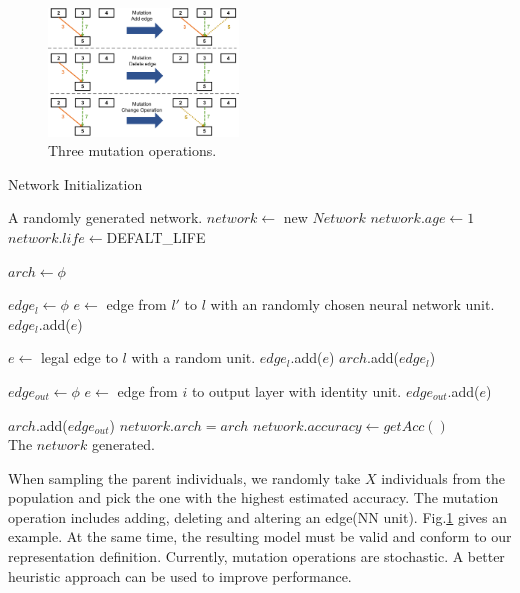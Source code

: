 \documentclass{article}
\begin{document}
\begin{normalsize}
 \begin{figure}[H]
   \centering
   \includegraphics[width=0.45\textwidth]{figures/mutation.png}
   \caption{Three mutation operations.}\label{fig:digit}
   \label{mutation}
 \end{figure}
  \begin{algorithm}[H]  
     \caption{ Network Initialization}
     
     
     \begin{algorithmic}[1]  
         \Ensure A randomly generated network.
     \State $network\gets $ new $Network$
     \State $network.age\gets1$
     \State $network.life\gets $DEFALT\_LIFE 
     
     \State $arch\gets \phi$
 
     \State $edge_l \gets \phi$
     \State $e \gets$ edge from $l'$ to $l$ with an randomly chosen neural network unit.
     \State $edge_l$.add($e$)
     \EndIf
         \EndFor
 
         \State  $e \gets$ legal edge to $l$ with a random unit.
         \State $edge_l$.add($e$)
         \EndIf
     \State $arch$.add($edge_l$)
         \EndFor
     
     \State $edge_{out} \gets \phi$
       \State $e \gets$ edge from $i$ to output layer with identity unit.
       \State $edge_{out}$.add($e$)
     \EndFor
 
     \State $arch$.add($edge_{out}$)
     \State $network.arch=arch$
     \State $network.accuracy\gets getAcc()$
     \\
         \Return The $network$ generated.
         
     \end{algorithmic}  
 \end{algorithm}  
 
   When sampling the parent individuals, we randomly take $X$ individuals from the population and pick the one with the highest estimated accuracy. The mutation operation includes adding, deleting and altering an edge(NN unit). Fig.\ref{mutation} gives an example. At the same time, the resulting model must be valid and conform to our representation definition. Currently, mutation operations are stochastic. A better heuristic approach can be used to improve performance.
 

\end{normalsize}
\end{document}
